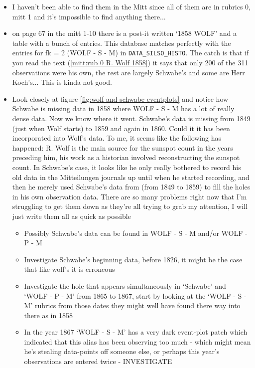 \documentclass[12pt]{article}
\begin{document}
\begin{itemize}
    \item I haven't been able to find them in the Mitt since all of them are in rubrics 0, mitt 1 and it's impossible to find anything there...
    \item on page 67 in the mitt 1-10 there is a post-it written `1858 WOLF' and a table with a bunch of entries. This database matches perfectly with the entries for fk = 2 (WOLF - S - M) in \texttt{DATA\_SILSO\_HISTO}. The catch is that if you read the text (\ref{mitt:rub 0 R. Wolf 1858}) it says that only 200 of the 311 observations were his own, the rest are largely Schwabe's and some are Herr Koch's... This is kinda not good.
    \item Look closely at figure \ref{fig:wolf and schwabe eventplots} and notice how Schwabe is missing data in 1858 where WOLF - S - M has a lot of really dense data. Now we know where it went. Schwabe's data is missing from 1849 (just when Wolf starts) to 1859 and again in 1860. Could it it has been incorporated into Wolf's data. To me, it seems like the following has happened: R. Wolf is the main source for the sunspot count in the years preceding him, his work as a historian involved reconstructing the sunspot count. In Schwabe's case, it looks like he only really bothered to record his old data in the Mitteilungen journals up until when he started recording, and then he merely used Schwabe's data from (from 1849 to 1859) to fill the holes in his own observation data. There are so many problems right now that I'm struggling to get them down as they're all trying to grab my attention, I will just write them all as quick as possible
    \begin{itemize}
        \item Possibly Schwabe's data can be found in WOLF - S - M and/or WOLF - P - M
        \item Investigate Schwabe's beginning data, before 1826, it might be the case that like wolf's it is erroneous
        \item Investigate the hole that appears simultaneously in `Schwabe' and `WOLF - P - M' from 1865 to 1867, start by looking at the `WOLF - S - M' rubrics from those dates they might well have found there way into there as in 1858
        \item In the year 1867 `WOLF - S - M' has a very dark event-plot patch which indicated that this alias has been observing too much - which might mean he's stealing data-points off someone else, or perhaps this year's observations are entered twice - INVESTIGATE
    \end{itemize}

\end{itemize}
\end{document}

